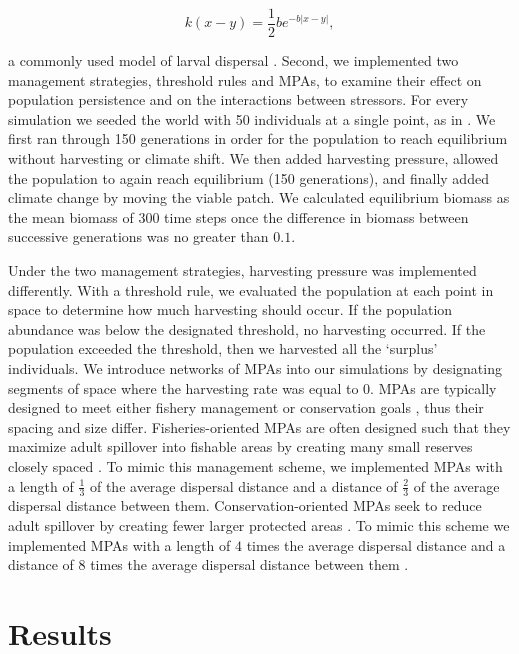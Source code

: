 \documentclass[12pt,english]{article}
\begin{document}
\begin{spacing}{1.9}
\begin{flushleft}
\[ k(x-y)=\frac{1}{2}be^{-b|x-y|},\]

\noindent a commonly used model of larval dispersal \citep{Pinsky:2011fk}.  Second, we implemented two management strategies, threshold rules and MPAs, to examine their effect on population persistence and on the interactions between stressors.  For every simulation we seeded the world with 50 individuals at a single point, as in \cite{ZhouKot2011}. We first ran through 150 generations in order for the population to reach equilibrium without harvesting or climate shift.  We then added harvesting pressure, allowed the population to again reach equilibrium (150 generations), and finally added climate change by moving the viable patch.  We calculated equilibrium biomass as the mean biomass of 300 time steps once the difference in biomass between successive generations was no greater than $0.1$.  

Under the two management strategies, harvesting pressure was implemented differently.  With a threshold rule, we evaluated the population at each point in space to determine how much harvesting should occur. If the population abundance was below the designated threshold, no harvesting occurred. If the population exceeded the threshold, then we harvested all the `surplus' individuals. We introduce networks of MPAs into our simulations by designating segments of space where the harvesting rate was equal to $0$.  MPAs are typically designed to meet either fishery management  or conservation goals \citep{Agardy1994, HollandBrazee1996, Gainesetal2010a}, thus their spacing and size differ.  Fisheries-oriented MPAs are often designed such that they maximize adult spillover into fishable areas by creating many small reserves closely spaced \citep{HastingsBotsford2003,Gaylordetal2005, Gainesetal2010a}. To mimic this management scheme, we implemented MPAs with a length of $\tfrac{1}{3}$ of the average dispersal distance and a distance of $\tfrac{2}{3}$ of the average dispersal distance between them.   Conservation-oriented MPAs seek to reduce adult spillover by creating fewer larger protected areas \citep{HastingsBotsford2006, Gainesetal2010a}.  To mimic this scheme we implemented MPAs with a length of $4$ times the average dispersal distance and a distance of $8$ times the average dispersal distance between them \citep{Lockwoodetal2002}. 

\section{Results}


\end{flushleft}
\end{spacing}
\end{document}
